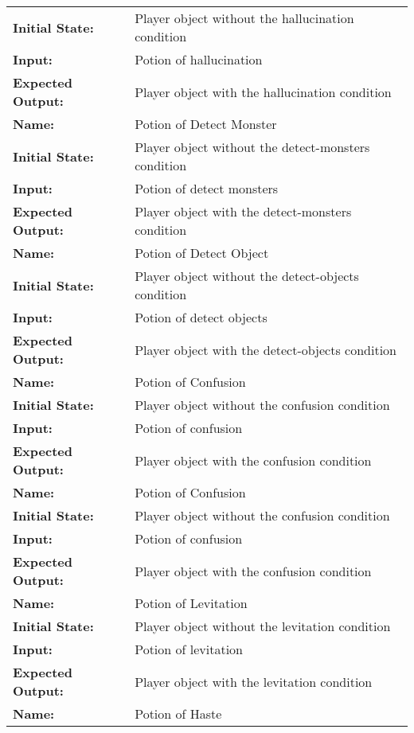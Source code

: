 \documentclass[12pt, titlepage]{article}
\begin{document}
\begin{center}
\begin{longtable}{ l | p{10cm} }
				\textbf{Initial State:} & Player object without the hallucination condition\\
				\textbf{Input:} & Potion of hallucination\\
				\textbf{Expected Output:} & Player object with the hallucination condition\\[0.6em]
				\hline
				\rule{0pt}{1.5em}\textbf{Name:} & Potion of Detect Monster\\
				\textbf{Initial State:} & Player object without the detect-monsters condition\\
				\textbf{Input:} & Potion of detect monsters\\
				\textbf{Expected Output:} & Player object with the detect-monsters condition\\[0.6em]
				\hline
				\rule{0pt}{1.5em}\textbf{Name:} & Potion of Detect Object\\
				\textbf{Initial State:} & Player object without the detect-objects condition\\
				\textbf{Input:} & Potion of detect objects\\
				\textbf{Expected Output:} & Player object with the detect-objects condition\\[0.6em]
				\hline
				\rule{0pt}{1.5em}\textbf{Name:} & Potion of Confusion\\
				\textbf{Initial State:} & Player object without the confusion condition\\
				\textbf{Input:} & Potion of confusion\\
				\textbf{Expected Output:} & Player object with the confusion condition\\[0.6em]
				\hline
				\rule{0pt}{1.5em}\textbf{Name:} & Potion of Confusion\\
				\textbf{Initial State:} & Player object without the confusion condition\\
				\textbf{Input:} & Potion of confusion\\
				\textbf{Expected Output:} & Player object with the confusion condition\\[0.6em]
				\hline
				\rule{0pt}{1.5em}\textbf{Name:} & Potion of Levitation\\
				\textbf{Initial State:} & Player object without the levitation condition\\
				\textbf{Input:} & Potion of levitation\\
				\textbf{Expected Output:} & Player object with the levitation condition\\[0.6em]
				\hline
				\rule{0pt}{1.5em}\textbf{Name:} & Potion of Haste\\

\end{longtable}
\end{center}
\end{document}
